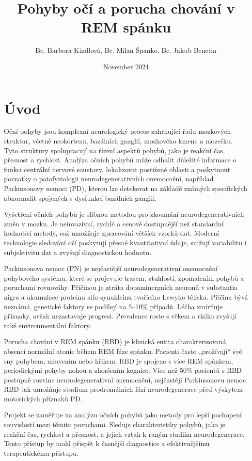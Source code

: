 \documentclass{article}
\title{Pohyby očí a porucha chování v REM spánku}
\author{Bc. Barbora Kindlová, Bc. Milan Španko, Bc. Jakub Benetin}
\date{November 2024}
\begin{document}
\maketitle

\section{Úvod}

Oční pohyby jsou komplexní neurologický proces zahrnující řadu mozkových struktur, včetně neokortexu, bazálních ganglií, mozkového kmene a mozečku. Tyto struktury spolupracují na řízení aspektů pohybů, jako je reakční čas, přesnost a rychlost. Analýza očních pohybů může odhalit důležité informace o funkci centrální nervové soustavy, lokalizovat postižené oblasti a poskytnout poznatky o patofyziologii neurodegenerativních onemocnění, například Parkinsonovy nemoci (PD), kterou lze detekovat na základě známých specifických abnormalit spojených s dysfunkcí bazálních ganglií. \cite{pretegiani2017eye}

Vyšetření očních pohybů je slibnou metodou pro zkoumání neurodegenerativních změn v mozku. Je neinvazivní, rychlé a cenově dostupnější než standardní hodnotící metody, což umožňuje zpracování větších vzorků dat. Moderní technologie sledování očí poskytují přesné kvantitativní údaje, snižují variabilitu i subjektivitu dat a zvyšují diagnostickou hodnotu.\cite{sekar2024detecting}

Parkinsonova nemoc (PN) je nejčastější neurodegenerativní onemocnění pohybového systému, které se projevuje trasem, ztuhlostí, zpomalením pohybů a poruchami rovnováhy. Příčinou je ztráta dopaminergních neuronů v substantia nigra a akumulace proteinu alfa-synukleinu tvořícího Lewyho tělíska. Příčina bývá neznámá, genetické faktory se podílejí na 5–10\% případů. Léčba zmírňuje příznaky, avšak nezastavuje progresi. Prevalence roste s věkem a riziko zvyšují také environmentální faktory.\cite{balestrino2020parkinson}

Porucha chování v REM spánku (RBD) je klinická entita charakterizovaná absencí normální atonie během REM fáze spánku. Pacienti často „prožívají“ své sny pohybem, mluvením nebo křikem. RBD je spojeno s více REM spánkem, periodickými pohyby nohou a zhoršením kognice. Více než 50\% pacientů s RBD postupně rozvine neurodegenerativní onemocnění, nejčastěji Parkinsonovu nemoc. RBD tak umožňuje studium prodromálních fází neurodegenerace před výskytem motorických příznaků PD.\cite{jiang2017rbd}

Projekt se zaměřuje na analýzu očních pohybů jako metody pro lepší pochopení souvislostí mezi těmito poruchami. Sleduje charakteristiky pohybů, jako je reakční čas, rychlost a přesnost, a jejich vztah k raným stadiím neurodegenerace. Tento přístup by mohl přispět k časnější diagnostice a efektivnějšímu terapeutickému přístupu.
\end{document}
